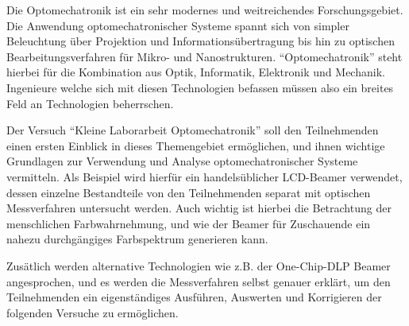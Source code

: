 
Die Optomechatronik ist ein sehr modernes und weitreichendes Forschungsgebiet. Die Anwendung optomechatronischer Systeme spannt sich von simpler Beleuchtung über Projektion und Informationsübertragung bis hin zu optischen Bearbeitungsverfahren für Mikro- und Nanostrukturen. ``Optomechatronik'' steht hierbei für die Kombination aus Optik, Informatik, Elektronik und Mechanik. Ingenieure welche sich mit diesen Technologien befassen müssen also ein breites Feld an Technologien beherrschen.

Der Versuch ``Kleine Laborarbeit Optomechatronik'' soll den Teilnehmenden einen ersten Einblick in dieses Themengebiet ermöglichen, und ihnen wichtige Grundlagen zur Verwendung und Analyse optomechatronischer Systeme vermitteln. Als Beispiel wird hierfür ein handelsüblicher LCD-Beamer verwendet, dessen einzelne Bestandteile von den Teilnehmenden separat mit optischen Messverfahren untersucht werden. Auch wichtig ist hierbei die Betrachtung der menschlichen Farbwahrnehmung, und wie der Beamer für Zuschauende ein nahezu durchgängiges Farbspektrum generieren kann.

Zusätlich werden alternative Technologien wie z.B. der One-Chip-DLP Beamer angesprochen, und es werden die Messverfahren selbst genauer erklärt, um den Teilnehmenden ein eigenständiges Ausführen, Auswerten und Korrigieren der folgenden Versuche zu ermöglichen.

